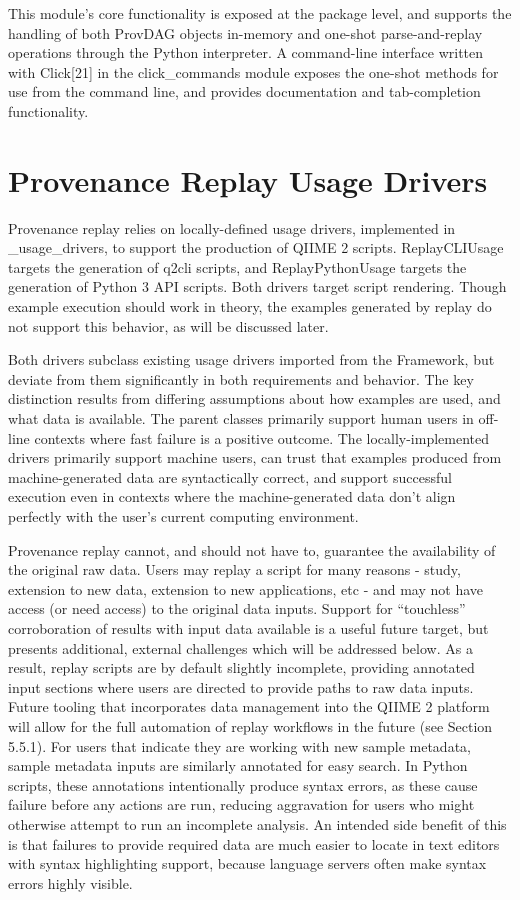 This module’s core functionality is exposed at the package level, and supports
the handling of both ProvDAG objects in-memory and one-shot parse-and-replay
operations through the Python interpreter. A command-line interface written with
Click[21] in the click\_commands module exposes the one-shot methods for use from
the command line, and provides documentation and tab-completion functionality.

\section{Provenance Replay Usage Drivers}

Provenance replay relies on locally-defined usage drivers, implemented in
\_usage\_drivers, to support the production of QIIME 2 scripts. ReplayCLIUsage
targets the generation of q2cli scripts, and ReplayPythonUsage targets the
generation of Python 3 API scripts. Both drivers target script rendering. Though
example execution should work in theory, the examples generated by replay do not
support this behavior, as will be discussed later.

Both drivers subclass existing usage drivers imported from the Framework, but
deviate from them significantly in both requirements and behavior. The key
distinction results from differing assumptions about how examples are used, and
what data is available. The parent classes primarily support human users in
off-line contexts where fast failure is a positive outcome. The
locally-implemented drivers primarily support machine users, can trust that
examples produced from machine-generated data are syntactically correct, and
support successful execution even in contexts where the machine-generated data
don’t align perfectly with the user’s current computing environment. 

Provenance replay cannot, and should not have to, guarantee the availability of
the original raw data. Users may replay a script for many reasons - study,
extension to new data, extension to new applications, etc - and may not have
access (or need access) to the original data inputs. Support for “touchless”
corroboration of results with input data available is a useful future target,
but presents additional, external challenges which will be addressed below. As a
result, replay scripts are by default slightly incomplete, providing annotated
input sections where users are directed to provide paths to raw data inputs.
Future tooling that incorporates data management into the QIIME 2 platform will
allow for the full automation of replay workflows in the future (see Section
5.5.1). For users that indicate they are working with new sample metadata,
sample metadata inputs are similarly annotated for easy search. In Python
scripts, these annotations intentionally produce syntax errors, as these cause
failure before any actions are run, reducing aggravation for users who might
otherwise attempt to run an incomplete analysis. An intended side benefit of
this is that failures to provide required data are much easier to locate in text
editors with syntax highlighting support, because language servers often make
syntax errors highly visible.

